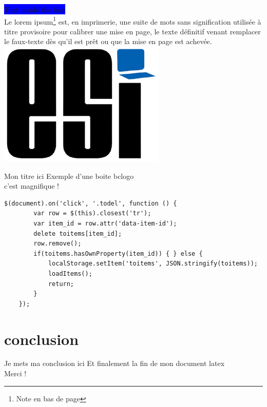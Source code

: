 \documentclass{article} %
\begin{document}
\colorbox{blue}{Text inside the box}
\\
Le lorem ipsum\footnote{Note en bas de page} est, en imprimerie, 
une suite de mots sans signification utilisée à titre provisoire 
pour calibrer une mise en page, le texte définitif venant remplacer le 
faux-texte dès qu'il est prêt ou que la mise en page est achevée.
\\
\vspace{1cm}
\includegraphics[scale=0.5]{img/ESI.png}
\\
\vspace{1cm}
\begin{bclogo}[couleur = green!30, arrondi = 0.1, ombre=true, epOmbre=0.45, couleurOmbre=black!85, logo=\bcplume]{Mon titre ici} %
Exemple d'une boite bclogo
\\ c'est magnifique !
\end{bclogo}
\vspace{1cm}
\begin{verbatim}
$(document).on('click', '.todel', function () {
        var row = $(this).closest('tr');
        var item_id = row.attr('data-item-id');
        delete toitems[item_id];
        row.remove();
        if(toitems.hasOwnProperty(item_id)) { } else {
            localStorage.setItem('toitems', JSON.stringify(toitems));
            loadItems();
            return;
        }
    });
\end{verbatim}
\section{conclusion}
Je mets ma conclusion ici
Et finalement la fin de mon document latex
\\Merci !
\end{document}

